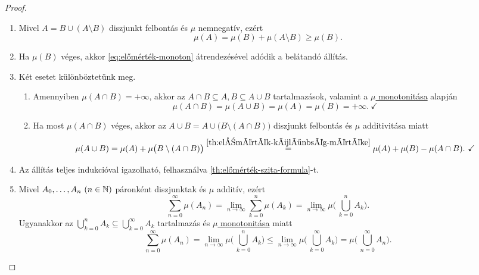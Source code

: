 \documentclass[
]{elteikthesis}[2024/04/26]
\begin{document}
	\begin{proof}\,
		\begin{enumerate}
			\item Mivel \( A = B \cup (A \setminus B) \) diszjunkt felbontás és \( \mu \) nemnegatív, ezért
			\[
			\mu(A) = \mu(B) + \mu(A \setminus B) \geq \mu(B). 
			\tag{\( * \)}\label{eq:előmérték-monoton}
			\]
			
			\item Ha \( \mu(B) \) véges, akkor \eqref{eq:előmérték-monoton} átrendezésével adódik a belátandó állítás.
			
			\item Két esetet különböztetünk meg.
			\begin{enumerate}
				\item Amennyiben \( \mu(A \cap B) = +\infty \), 
				akkor az \( A \cap B \subseteq A, B \subseteq A \cup B \) tartalmazások,
				valamint a \hyperref[th:előmérték-monoton]{\( \mu \) monotonitása} alapján
				\[
				\mu(A \cap B) = \mu(A \cup B) = \mu(A) = \mu(B) = +\infty.\ \checkmark
				\]
				
				\item Ha most \( \mu(A \cap B) \) véges, 
				akkor az \( A \cup B = A \cup \bigl( B \setminus (A \cap B) \bigr) \) diszjunkt felbontás és \( \mu \) additivitása miatt
				\[
				\mu(A \cup B) = 
				\mu(A) + \mu \bigl( B \setminus (A \cap B) \bigr) \overset{\ref{th:előmérték-különbség-mértéke}}{=} 
				\mu(A) + \mu(B) - \mu( A \cap B).\ \checkmark
				\]
			\end{enumerate}
			
			\item Az állítás teljes indukcióval igazolható, 
			felhasználva \ref{th:előmérték-szita-formula}-t.
			
			\item Mivel \( A_0, \dots, A_n \ (n \in \mathbb{N}) \) páronként diszjunktak 
			és \( \mu \) additív, ezért
			\[
			\sum_{n=0}^{\infty} \mu( A_n ) =
			\lim_{n \to \infty} \sum_{k=0}^{n} \mu( A_k ) =
			\lim_{n \to \infty} \mu \Biggl( \, \bigcup_{k=0}^n \! A_k \Biggr).
			\]
			Ugyanakkor az
			\( \bigcup\limits_{k=0}^n \! A_k \subseteq \bigcup\limits_{k=0}^{\infty} \! A_k \)
			tartalmazás és \hyperref[th:előmérték-monoton]{\( \mu \) monotonitása} miatt
			\[
			\sum_{n=0}^{\infty} \mu( A_n ) =
			\lim_{n \to \infty} \mu \Biggl( \, \bigcup_{k=0}^n \! A_k \Biggr) \leq
			\lim_{n \to \infty} \mu \Biggl( \, \bigcup_{k=0}^{\infty} \! A_k \Biggr) =
			\mu \Biggl( \, \bigcup_{n=0}^{\infty} \! A_n \Biggr).
			\]
		\end{enumerate}
	\end{proof}
	
\end{document}
